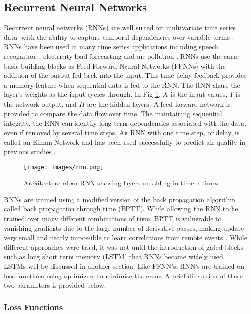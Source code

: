\documentclass[preprint,12pt,authoryear]{elsarticle}
\begin{document}
\begin{linenumbers}
\subsection{Recurrent Neural Networks}
Recurrent neural networks (RNNs) are well suited for multivariate time series data, with the ability to capture temporal dependencies over variable terms \citep{Che2016}. RNNs have been used in many time series applications including speech recognition \citep{Graves2013}, electricity load forecasting \citep{Walid2017} and air pollution \citep{Biancofiore2017}. RNNs use the same basic building blocks as Feed Forward Neural Networks (FFNNs) with the addition of the output fed back into the input. This time delay feedback provides a memory feature when sequential data is fed to the RNN. The RNN share the layer's weights as the input cycles through. In Fig \ref{fig:rnn}, $X$ is the input values, $Y$ is the network output, and $H$ are the hidden layers. A feed forward network is provided to compare the data flow over time. The maintaining sequential integrity, the RNN can identify long-term dependencies associated with the data, even if removed by several time steps. An RNN with one time step, or delay, is called an Elman Network and has been used successfully to predict air quality in previous studies \citep{Biancofiore2015}.

%
\begin{figure}[H]
\centering
\texttt{[image: images/rnn.png]}  %
\caption{Architecture of an RNN showing layers unfolding in time n times.}
\label{fig:rnn}
\end{figure}
%

RNNs are trained using a modified version of the back propagation algorithm called back propagation through time (BPTT). While allowing the RNN to be trained over many different combinations of time, BPTT is vulnerable to vanishing gradients due to the large number of derivative passes, making update very small and nearly impossible to learn correlations from remote events \citep{Pascanu2013}. While different approaches were tried, it was not until the introduction of gated blocks such as long short term memory (LSTM) that RNNs became widely used. LSTMs will be discussed in another section. Like FFNN's, RNN's are trained on loss functions using optimizers to minimize the error. A brief discussion of these two parameters is provided below.

\subsubsection{Loss Functions}


\end{linenumbers}
\end{document}

